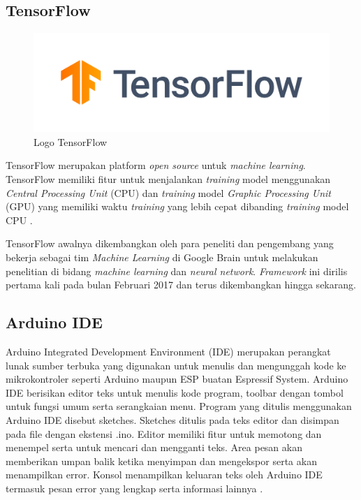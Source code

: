 \subsection{TensorFlow} 

\begin{figure} [ht] \centering
    \includegraphics[scale=0.65]{gambar/TensorflowLogo.png}
    \caption{Logo TensorFlow}
    \label{fig:TensorflowLogo}
\end{figure}

TensorFlow merupakan platform \emph{open source} untuk \emph{machine learning}. TensorFlow memiliki fitur untuk menjalankan \emph{training} model menggunakan \emph{Central Processing Unit} (CPU) dan \emph{training} model \emph{Graphic Processing Unit} (GPU) yang memiliki waktu \emph{training} yang lebih cepat dibanding \emph{training} model CPU \parencite{nurfita2018implementasi}.

TensorFlow awalnya dikembangkan oleh para peneliti dan pengembang yang bekerja sebagai tim \emph{Machine Learning} di Google Brain untuk melakukan penelitian di bidang \emph{machine learning} dan \emph{neural network}. \emph{Framework} ini dirilis pertama kali pada bulan Februari 2017 dan terus dikembangkan hingga sekarang\parencite{Developers_2021}.

\subsection{Arduino IDE}

Arduino Integrated Development Environment (IDE) merupakan perangkat lunak sumber terbuka yang digunakan untuk menulis dan mengunggah kode ke mikrokontroler seperti Arduino maupun ESP buatan Espressif System. Arduino IDE berisikan editor teks untuk menulis kode program, toolbar dengan tombol untuk fungsi umum serta serangkaian menu. Program yang ditulis menggunakan Arduino IDE disebut sketches. Sketches ditulis 
pada teks editor dan disimpan pada file dengan ekstensi .ino. Editor memiliki fitur untuk memotong dan menempel serta untuk mencari dan mengganti teks. Area pesan akan memberikan umpan balik ketika menyimpan dan mengekspor serta akan menampilkan error. Konsol menampilkan keluaran teks oleh Arduino IDE termasuk pesan error yang lengkap serta informasi lainnya \parencite{Söderby_Hylén_2023a}.

